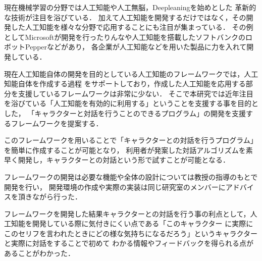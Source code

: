 %

現在機械学習の分野では人工知能や人工無脳，Deepleaningを始めとした
革新的な技術が注目を浴びている．
加えて人工知能を開発するだけではなく，その開発した人工知能を様々な分野で応用することにも注目が集まっている．
その例としてMicrosoftが開発を行ったりんなや人工知能を搭載したソフトバンクのロボットPepperなどがあり，
各企業が人工知能などを用いた製品に力を入れて開発している．

現在人工知能自体の開発を目的としている人工知能のフレームワークでは，人工知能自体を作成する過程
をサポートしており，作成した人工知能を応用する部分を支援しているフレームワークは非常に少ない．
そこで本研究では近年注目を浴びている「人工知能を有効的に利用する」ということを支援する事を目的とした，
「キャラクターと対話を行うことのできるプログラム」の開発を支援するフレームワークを提案する．

このフレームワークを用いることで「キャラクターとの対話を行うプログラム」を簡単に作成することが可能となり，
利用者が発案した対話アルゴリズムを素早く開発し，キャラクターとの対話という形で試すことが可能となる．

フレームワークの開発は必要な機能や全体の設計については教授の指導のもとで開発を行い，
開発環境の作成や実際の実装は同じ研究室のメンバーにアドバイスを頂きながら行った．

フレームワークを開発した結果キャラクターとの対話を行う事の利点として，人工知能を開発している際に気付きにくい点である「このキャラクター
に実際にこのセリフを言われたときにどの様な気持ちになるだろう」というキャラクターと実際に対話をすることで初めて
わかる情報やフィードバックを得られる点があることがわかった．
